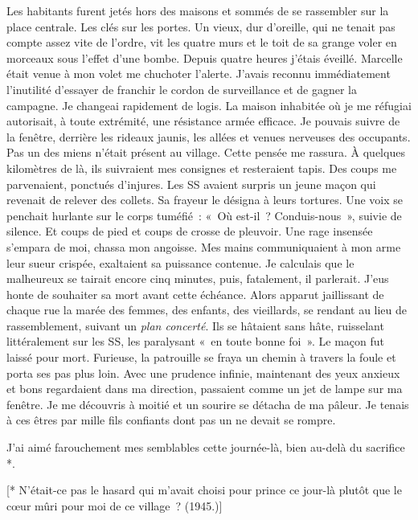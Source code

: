 {Les habitants furent jetés hors des maisons et sommés de se rassembler
sur la place centrale. Les clés sur les portes. Un vieux, dur
d'oreille, qui ne tenait pas compte assez vite de l'ordre, vit les
quatre murs et le toit de sa grange voler en morceaux sous l'effet
d'une bombe. Depuis quatre heures j'étais éveillé. Marcelle était
venue à mon volet me chuchoter l'alerte. J'avais reconnu
immédiatement l'inutilité d'essayer de franchir le cordon de
surveillance et de gagner la campagne. Je changeai rapidement de
logis. La maison inhabitée où je me réfugiai autorisait, à toute
extrémité, une résistance armée efficace. Je pouvais suivre de la
fenêtre, derrière les rideaux jaunis, les allées et venues nerveuses
des occupants. Pas un des miens n'était présent au village. Cette
pensée me rassura. À quelques kilomètres de là, ils suivraient mes
consignes et resteraient tapis. Des coups me parvenaient, ponctués
d'injures. Les SS avaient surpris un jeune maçon qui revenait de
relever des collets. Sa frayeur le désigna à leurs tortures. Une voix
se penchait hurlante sur le corps tuméfié~: «~Où est-il~?
Conduis-nous~», suivie de silence. Et coups de pied et coups de
crosse de pleuvoir. Une rage insensée s'empara de moi, chassa mon
angoisse. Mes mains communiquaient à mon arme leur sueur crispée,
exaltaient sa puissance contenue. Je calculais que le malheureux se
tairait encore cinq minutes, puis, fatalement, il parlerait. J'eus
honte de souhaiter sa mort avant cette échéance. Alors apparut
jaillissant de chaque rue la marée des femmes, des enfants, des
vieillards, se rendant au lieu de rassemblement, suivant un
\textit{plan concerté}. Ils se hâtaient sans hâte, ruisselant
littéralement sur les SS, les paralysant «~en toute bonne foi~». Le
maçon fut laissé pour mort. Furieuse, la patrouille se fraya un
chemin à travers la foule et porta ses pas plus loin. Avec une
prudence infinie, maintenant des yeux anxieux et bons regardaient
dans ma direction, passaient comme un jet de lampe sur ma fenêtre. Je
me découvris à moitié et un sourire se détacha de ma pâleur. Je
tenais à ces êtres par mille fils confiants dont pas un ne devait se
rompre.

J'ai aimé farouchement mes semblables cette journée-là, bien au-delà
du sacrifice *.

[* N'était-ce pas le hasard qui m'avait choisi pour prince ce jour-là
plutôt que le cœur mûri pour moi de ce village~? (1945.)]
}

